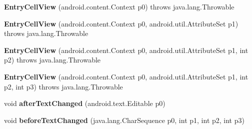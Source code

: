 \begin{DoxyCompactItemize}
\item 
\mbox{\label{classmd5b60ffeb829f638581ab2bb9b1a7f4f3f_1_1_entry_cell_view_adbbaf6527f6daa54b8c17455243a5806}} 
{\bfseries Entry\+Cell\+View} (android.\+content.\+Context p0)  throws java.\+lang.\+Throwable 	
\item 
\mbox{\label{classmd5b60ffeb829f638581ab2bb9b1a7f4f3f_1_1_entry_cell_view_a34f28cd0cc7b56ce0ac2064e7138170b}} 
{\bfseries Entry\+Cell\+View} (android.\+content.\+Context p0, android.\+util.\+Attribute\+Set p1)  throws java.\+lang.\+Throwable 	
\item 
\mbox{\label{classmd5b60ffeb829f638581ab2bb9b1a7f4f3f_1_1_entry_cell_view_a2b0135e0b61be293bb38a6ac7d2c9b3f}} 
{\bfseries Entry\+Cell\+View} (android.\+content.\+Context p0, android.\+util.\+Attribute\+Set p1, int p2)  throws java.\+lang.\+Throwable 	
\item 
\mbox{\label{classmd5b60ffeb829f638581ab2bb9b1a7f4f3f_1_1_entry_cell_view_a14a969f0bee94c6d0e466e8556927658}} 
{\bfseries Entry\+Cell\+View} (android.\+content.\+Context p0, android.\+util.\+Attribute\+Set p1, int p2, int p3)  throws java.\+lang.\+Throwable 	
\item 
\mbox{\label{classmd5b60ffeb829f638581ab2bb9b1a7f4f3f_1_1_entry_cell_view_a62f9d563c0b08b8bd5ca59c1794f5ed0}} 
void {\bfseries after\+Text\+Changed} (android.\+text.\+Editable p0)
\item 
\mbox{\label{classmd5b60ffeb829f638581ab2bb9b1a7f4f3f_1_1_entry_cell_view_acfae287696d61b422c2c4a85025777da}} 
void {\bfseries before\+Text\+Changed} (java.\+lang.\+Char\+Sequence p0, int p1, int p2, int p3)
\item 
\mbox{\label{classmd5b60ffeb829f638581ab2bb9b1a7f4f3f_1_1_entry_cell_view_a330adc10508be12c9c6ce3d433f4d2cf}} 

\end{DoxyCompactItemize}
